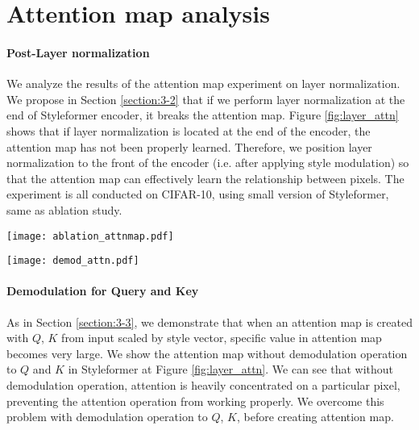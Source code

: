 \documentclass[10pt,twocolumn,letterpaper]{article}
\begin{document}
\section{Attention map analysis}
\label{app:B}
\paragraph{Post-Layer normalization}
We analyze the results of the attention map experiment on layer normalization. We propose in Section \ref{section:3-2} that if we perform layer normalization at the end of Styleformer encoder, it breaks the attention map. Figure \ref{fig:layer_attn} shows that if layer normalization is located at the end of the encoder, the attention map has not been properly learned. Therefore, we position layer normalization to the front of the encoder (i.e. after applying style modulation) so that the attention map can effectively learn the relationship between pixels. The experiment is all conducted on CIFAR-10, using small version of Styleformer, same as ablation study. 

\begin{figure*}[t]
\begin{center}
\texttt{[image: ablation\_attnmap.pdf]}
\end{center}
\vspace{-5mm}
\caption{
Comparison of attention map experimented based on Layer Normalization
}
\vspace{-3mm}
\label{fig:layer_attn}
\end{figure*}

\begin{figure*}[t]
\begin{center}
\texttt{[image: demod\_attn.pdf]}
\end{center}
\vspace{-5mm}
\caption{
Attention map without demodulation operation to query and key. Comparing with Figure \ref{fig:layer_attn} upper row, we can see specific large value in attention map.
}
\vspace{-3mm}
\label{fig:demod_attn}
\end{figure*}



\paragraph{Demodulation for Query and Key}
As in Section \ref{section:3-3}, we demonstrate that when an attention map is created with $Q$, $K$ from input scaled by style vector, specific value in attention map becomes very large. We show the attention map without demodulation operation to $Q$ and 
$K$ in Styleformer at Figure \ref{fig:layer_attn}. We can see that without demodulation operation, attention is heavily concentrated on a particular pixel, preventing the attention operation from working properly. We overcome this problem with demodulation operation to $Q$, $K$, before creating attention map. 
\end{document}

